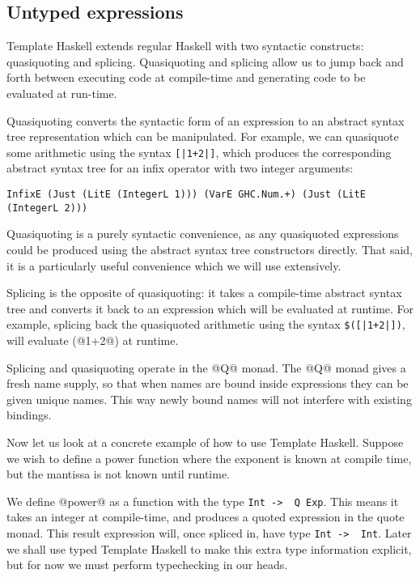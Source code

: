 \subsection{Untyped expressions}

Template Haskell extends regular Haskell with two syntactic constructs: quasiquoting and splicing.
Quasiquoting and splicing allow us to jump back and forth between executing code at compile-time and generating code to be evaluated at run-time.

Quasiquoting converts the syntactic form of an expression to an abstract syntax tree representation which can be manipulated.
For example, we can quasiquote some arithmetic using the syntax \lstinline/[|1+2|]/, which produces the corresponding abstract syntax tree for an infix operator with two integer arguments:

\begin{lstlisting}
InfixE (Just (LitE (IntegerL 1))) (VarE GHC.Num.+) (Just (LitE (IntegerL 2)))
\end{lstlisting}

Quasiquoting is a purely syntactic convenience, as any quasiquoted expressions could be produced using the abstract syntax tree constructors directly.
That said, it is a particularly useful convenience which we will use extensively.

Splicing is the opposite of quasiquoting: it takes a compile-time abstract syntax tree and converts it back to an expression which will be evaluated at runtime.
For example, splicing back the quasiquoted arithmetic using the syntax \lstinline/$([|1+2|])/, will evaluate (@1+2@) at runtime.

Splicing and quasiquoting operate in the @Q@ monad.
The @Q@ monad gives a fresh name supply, so that when names are bound inside expressions they can be given unique names.
This way newly bound names will not interfere with existing bindings.

Now let us look at a concrete example of how to use Template Haskell.
Suppose we wish to define a power function where the exponent is known at compile time, but the mantissa is not known until runtime.

We define @power@ as a function with the type \lstinline/Int ->  Q Exp/.
This means it takes an integer at compile-time, and produces a quoted expression in the quote monad.
This result expression will, once spliced in, have type \lstinline/Int ->  Int/.
Later we shall use typed Template Haskell to make this extra type information explicit, but for now we must perform typechecking in our heads.

